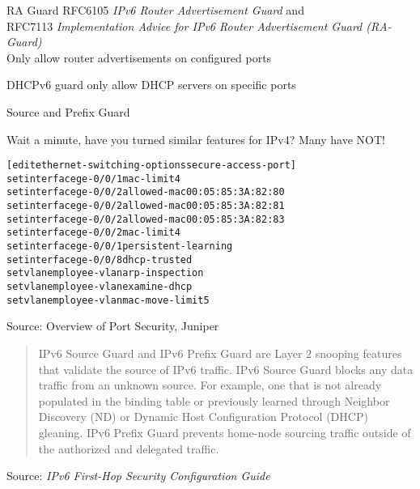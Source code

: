 \documentclass[Screen16to9,17pt]{foils}
\begin{document}
\begin{list2}
\item RA Guard RFC6105 \emph{IPv6 Router Advertisement Guard} and \\
RFC7113 \emph{Implementation Advice for IPv6 Router Advertisement Guard (RA-Guard)}\\
Only allow router advertisements on configured ports
\item DHCPv6 guard only allow DHCP servers on specific ports
\item Source and Prefix Guard
\end{list2}

Wait a minute, have you turned similar features for IPv4? Many have NOT! {\myalert}


\begin{alltt}\small
[edit ethernet-switching-options secure-access-port]
set interface ge-0/0/1 mac-limit 4
set interface ge-0/0/2 allowed-mac 00:05:85:3A:82:80
set interface ge-0/0/2 allowed-mac 00:05:85:3A:82:81
set interface ge-0/0/2 allowed-mac 00:05:85:3A:82:83
set interface ge-0/0/2 mac-limit 4
set interface ge-0/0/1 persistent-learning
set interface ge-0/0/8 dhcp-trusted
set vlan employee-vlan arp-inspection
set vlan employee-vlan examine-dhcp
set vlan employee-vlan mac-move-limit 5
\end{alltt}

Source: Overview of Port Security, Juniper\\ {\small{}}



\begin{quote}
IPv6 Source Guard and IPv6 Prefix Guard are Layer 2 snooping features that validate the source of IPv6 traffic. IPv6 Source Guard blocks any data traffic from an unknown source. For example, one that is not already populated in the binding table or previously learned through Neighbor Discovery (ND) or Dynamic Host Configuration Protocol (DHCP) gleaning. IPv6 Prefix Guard prevents home-node sourcing traffic outside of the authorized and delegated traffic.
\end{quote}
Source: \emph{IPv6 First-Hop Security Configuration Guide}\\
\end{document}
